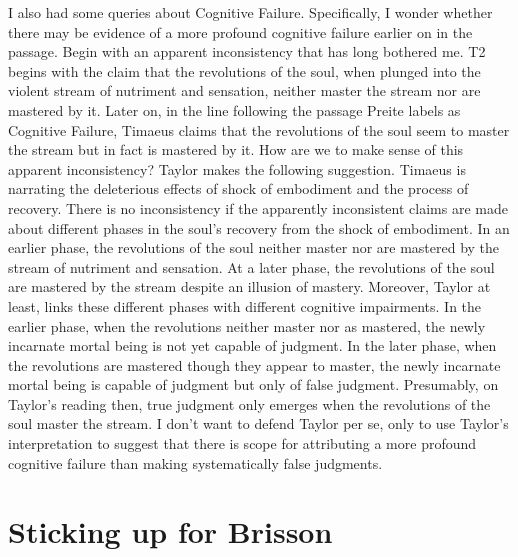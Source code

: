 \documentclass[12pt]{article}
\begin{document}
I also had some queries about Cognitive Failure. Specifically, I wonder whether there may be evidence of a more profound cognitive failure earlier on in the passage. Begin with an apparent inconsistency that has long bothered me. T2 begins with the claim that the revolutions of the soul, when plunged into the violent stream of nutriment and sensation, neither master the stream nor are mastered by it. Later on, in the line following the passage Preite labels as Cognitive Failure, Timaeus claims that the revolutions of the soul seem to master the stream but in fact is mastered by it. How are we to make sense of this apparent inconsistency? Taylor makes the following suggestion. Timaeus is narrating the deleterious effects of shock of embodiment and the process of recovery. There is no inconsistency if the apparently inconsistent claims are made about different phases in the soul's recovery from the shock of embodiment. In an earlier phase, the revolutions of the soul neither master nor are mastered by the stream of nutriment and sensation. At a later phase, the revolutions of the soul are mastered by the stream despite an illusion of mastery. Moreover, Taylor at least, links these different phases with different cognitive impairments. In the earlier phase, when the revolutions neither master nor as mastered, the newly incarnate mortal being is not yet capable of judgment. In the later phase, when the revolutions are mastered though they appear to master, the newly incarnate mortal being is capable of judgment but only of false judgment. Presumably, on Taylor's reading then, true judgment only emerges when the revolutions of the soul master the stream. I don't want to defend Taylor per se, only to use Taylor's interpretation to suggest that there is scope for attributing a more profound cognitive failure than making systematically false judgments.


\section{Sticking up for Brisson} %
\label{sec:sticking_up_for_brisson}
\end{document}
